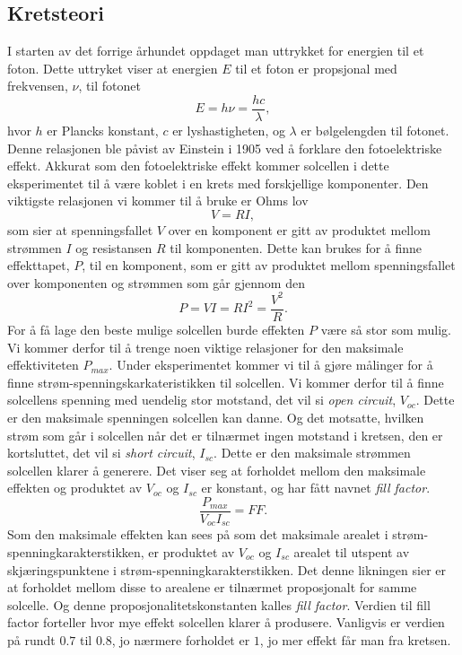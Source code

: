 \documentclass[%
 reprint,
 amsmath,amssymb,
 aps,
 norsk,
 booktabs
]{revtex4-1}
\begin{document}
\subsection{Kretsteori}
I starten av det forrige århundet oppdaget man uttrykket for energien til et foton. Dette uttryket viser at energien $E$ til et foton er propsjonal med frekvensen, $\nu$, til fotonet
\begin{equation}
  E = h\nu = \frac{hc}{\lambda} \label{einstein},
\end{equation}hvor $h$ er Plancks konstant, $c$ er lyshastigheten, og $\lambda$ er bølgelengden til fotonet. Denne relasjonen ble påvist av Einstein i 1905 ved å forklare den fotoelektriske effekt. Akkurat som den fotoelektriske effekt kommer solcellen i dette eksperimentet til å være koblet i en krets med forskjellige komponenter. Den viktigste relasjonen vi kommer til å bruke er Ohms lov
\begin{equation}
  V = RI,
\end{equation}som sier at spenningsfallet $V$ over en komponent er gitt av produktet mellom strømmen $I$ og resistansen $R$ til komponenten. Dette kan brukes for å finne effekttapet, $P$, til en komponent, som er gitt av produktet mellom spenningsfallet over komponenten og strømmen som går gjennom den
\begin{equation}
  P = VI = RI^2 = \frac{V^2}{R} \label{effekt1}.
\end{equation}For å få lage den beste mulige solcellen burde effekten $P$ være så stor som mulig. Vi kommer derfor til å trenge noen viktige relasjoner for den maksimale effektiviteten $P_{max}$. Under eksperimentet kommer vi til å gjøre målinger for å finne strøm-spenningskarkateristikken til solcellen. Vi kommer derfor til å finne solcellens spenning med uendelig stor motstand, det vil si \textit{open circuit}, $V_{oc}$. Dette er den maksimale spenningen solcellen kan danne. Og det motsatte, hvilken strøm som går i solcellen når det er tilnærmet ingen motstand i kretsen, den er kortsluttet, det vil si \textit{short circuit}, $I_{sc}$. Dette er den maksimale strømmen solcellen klarer å generere. Det viser seg at forholdet mellom den maksimale effekten og produktet av $V_{oc}$ og $I_{sc}$ er konstant, og har fått navnet \textit{fill factor}.
\begin{equation}
  \frac{P_{max}}{V_{oc}I_{sc}} = FF. \label{ff}
\end{equation}
Som den maksimale effekten kan sees på som det maksimale arealet i strøm-spenningkarakterstikken, er produktet av $V_{oc}$ og $I_{sc}$ arealet til utspent av skjæringspunktene i strøm-spenningkarakterstikken. Det denne likningen sier er at forholdet mellom disse to arealene er tilnærmet proposjonalt for samme solcelle. Og denne proposjonalitetskonstanten kalles \textit{fill factor}. Verdien til fill factor forteller hvor mye effekt solcellen klarer å produsere. Vanligvis er verdien på rundt $0.7$ til $0.8$, jo nærmere forholdet er $1$, jo mer effekt får man fra kretsen.\\
\end{document}

